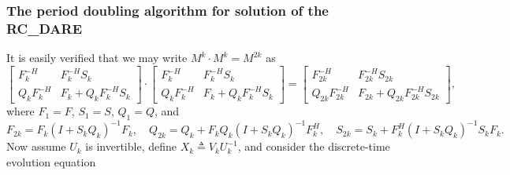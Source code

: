 \begin{figure*}[t]

\end{figure*}

\subsubsection{The period doubling algorithm for solution of the RC_DARE}\label{subsec:Ddoubling}

It is easily verified that we may write $M^k\cdot M^k = M^{2k}$ as
\begin{equation}
\label{eq:idenperdub}
\begin{bmatrix}  F_k^{-H} & F_k^{-H}S_k \\ Q_k F_k^{-H} & F_k+ Q_k F_k^{-H}S_k  \end{bmatrix} \cdot \begin{bmatrix} F_k^{-H} & F_k^{-H}S_k \\ Q_k F_k^{-H} & F_k+ Q_k F_k^{-H}S_k  \end{bmatrix} =
\begin{bmatrix} F_{2k}^{-H} & F_{2k}^{-H}S_{2k} \\ Q_{2k} F_{2k}^{-H} & F_{2k}+ Q_{2k} F_{2k}^{-H}S_{2k} \end{bmatrix},
\end{equation}
where $F_1=F$, $S_1=S$, $Q_1=Q$, and
\begin{equation}
F_{2k} = F_k (I+ S_k Q_k)^{-1} F_k, \quad Q_{2k} = Q_k + F_k Q_k (I+S_k Q_k)^{-1} F^H_k, \quad S_{2k} = S_k + F^H_k (I+S_k Q_k)^{-1}  S_k F_k.
\label{eq:perdubiter}
\end{equation}
Now assume $U_k$ is invertible, define $X_k \triangleq V_k U_k^{-1}$, and consider the discrete-time evolution equation
